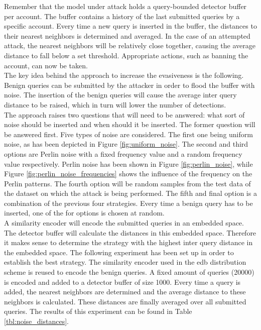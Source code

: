 Remember that the model under attack holds a query-bounded detector buffer per account. The buffer contains a history of the last submitted queries by a specific account. Every time a new query is inserted in the buffer, the distances to their nearest neighbors is determined and averaged. In the case of an attempted attack, the nearest neighbors will be relatively close together, causing the average distance to fall below a set threshold. Appropriate actions, such as banning the account, can now be taken.\\

The key idea behind the approach to increase the evasiveness is the following. Benign queries can be submitted by the attacker in order to flood the buffer with noise. The insertion of the benign queries will cause the average inter query distance to be raised, which in turn will lower the number of detections.\\

The approach raises two questions that will need to be answered: what sort of noise should be inserted and when should it be inserted. The former question will be answered first. Five types of noise are considered. The first one being uniform noise, as has been depicted in Figure \ref{fig:uniform_noise}. The second and third options are Perlin noise with a fixed frequency value and a random frequency value respectively. Perlin noise has been shown in Figure \ref{fig:perlin_noise}, while Figure \ref{fig:perlin_noise_frequencies} shows the influence of the frequency on the Perlin patterns. The fourth option will be random samples from the test data of the dataset on which the attack is being performed. The fifth and final option is a combination of the previous four strategies. Every time a benign query has to be inserted, one of the for options is chosen at random.\\

A similarity encoder will encode the submitted queries in an embedded space. The detector buffer will calculate the distances in this embedded space. Therefore it makes sense to determine the strategy with the highest inter query distance in the embedded space. The following experiment has been set up in order to establish the best strategy. The similarity encoder used in the \gls{edb} distribution scheme is reused to encode the benign queries. A fixed amount of queries (\num{20000}) is encoded and added to a detector buffer of size \num{1000}. Every time a query is added, the nearest neighbors are determined and the average distance to these neighbors is calculated. These distances are finally averaged over all submitted queries. The results of this experiment can be found in Table \ref{tbl:noise_distances}.\\

